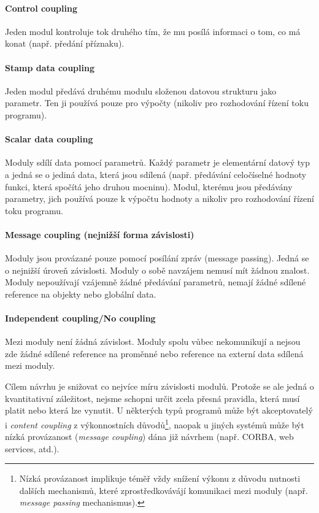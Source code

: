 \paragraph{Control coupling} Jeden modul kontroluje tok druhého tím, že mu posílá informaci o tom, co má konat (např. předání  příznaku).

\paragraph{Stamp data coupling} Jeden modul předává druhému modulu složenou datovou strukturu jako parametr. Ten ji používá pouze pro výpočty (nikoliv pro rozhodování řízení toku programu).

\paragraph{Scalar data coupling} Moduly sdílí data pomocí parametrů. Každý parametr je elementární datový typ a jedná se o jediná data, která jsou sdílená (např. předávání celočíselné hodnoty funkci, která spočítá jeho druhou mocninu). Modul, kterému jsou předávány parametry, jich používá pouze k výpočtu hodnoty a nikoliv pro rozhodování řízení toku programu.

\paragraph{Message coupling (nejnižší forma závislosti)} Moduly jsou provázané pouze pomocí posílání zpráv (message passing). Jedná se o nejnižší úroveň závislosti. Moduly o sobě navzájem nemusí mít žádnou znalost. Moduly nepoužívají vzájemně žádné předávání parametrů, nemají žádné sdílené reference na objekty nebo globální data.

\paragraph{Independent coupling/No coupling} Mezi moduly není žádná závislost. Moduly spolu vůbec nekomunikují a nejsou zde žádné sdílené reference na proměnné nebo reference na externí data sdílená mezi moduly.

\vspace{1cm}

Cílem návrhu je snižovat co nejvíce míru závislosti modulů. Protože se ale jedná o kvantitativní záležitost, nejsme schopni určit zcela přesná pravidla, která musí platit nebo která lze vynutit. U některých typů programů může být akceptovatelý i \emph{content coupling} z výkonnostních důvodů\footnote{Nízká provázanost implikuje téměř vždy snížení výkonu z důvodu nutnosti dalších mechanismů, které zprostředkovávájí komunikaci mezi moduly (např. \emph{message passing} mechanismus).}, naopak u jiných systémů může být nízká provázanost (\emph{message coupling}) dána již návrhem (např. CORBA, web services, atd.).

